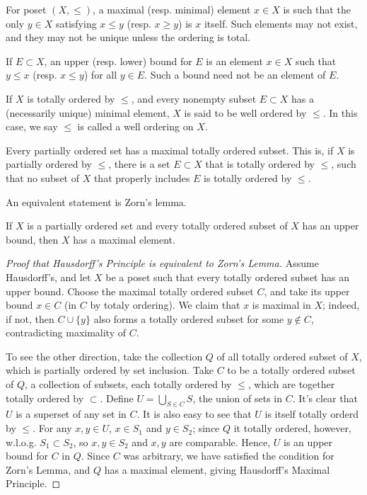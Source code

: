 \documentclass[12pt]{article} %
\begin{document}
\begin{definition}
    For poset $(X, \leq)$, a maximal (resp. minimal) element $x \in X$ is such that the only $y \in X$ satisfying $x \leq y$ (resp. $x \geq y$) is $x$ itself. Such elements may not exist, and they may not be unique unless the ordering is total.

    If $E \subset X$, an upper (resp. lower) bound for $E$ is an element $x \in X$ such that $y \leq x$ (resp. $x \leq y$) for all $y \in E$. Such a bound need not be an element of $E$.
\end{definition}

\begin{definition}
    If $X$ is totally ordered by $\leq$, and every nonempty subset $E \subset X$ has a (necessarily unique) minimal element, $X$ is said to be well ordered by $\leq$. In this case, we say $\leq$ is called a well ordering on $X$.
\end{definition}

\begin{principle}
    Every partially ordered set has a maximal totally ordered subset. This is, if $X$ is partially ordered by $\leq$, there is a set $E \subset X$ that is totally ordered by $\leq$, such that no subset of $X$ that properly includes $E$ is totally ordered by $\leq$.
\end{principle}

\noindent An equivalent statement is Zorn's lemma.

\begin{principle}
    If $X$ is a partially ordered set and every totally ordered subset of $X$ has an upper bound, then $X$ has a maximal element.
\end{principle}

\begin{proof}[Proof that Hausdorff's Principle is equivalent to Zorn's Lemma]
    Assume Hausdorff's, and let $X$ be a poset such that every totally ordered subset has an upper bound. Choose the maximal totally ordered subset $C$, and take its upper bound $x \in C$ (in $C$ by totaly ordering). We claim that $x$ is maximal in $X$; indeed, if not, then $C \cup \{y\}$ also forms a totally ordered subset for some $y \notin C$, contradicting maximality of $C$.

    To see the other direction, take the collection $Q$ of all totally ordered subset of $X$, which is partially ordered by set inclusion. Take $C$ to be a totally ordered subset of $Q$, a collection of subsets, each totally ordered by $\leq$, which are together totally ordered by $\subset$. Define $U = \bigcup_{S \in C} S$, the union of sets in $C$. It's clear that $U$ is a superset of any set in $C$. It is also easy to see that $U$ is itself totally orderd by $\leq$. For any $x, y \in U$, $x \in S_1$ and $y \in S_2$; since $Q$ it totally ordered, however, w.l.o.g. $S_1 \subset S_2$, so $x, y \in S_2$ and $x, y$ are comparable. Hence, $U$ is an upper bound for $C$ in $Q$. Since $C$ was arbitrary, we have satisfied the condition for Zorn's Lemma, and $Q$ has a maximal element, giving Hausdorff's Maximal Principle.
\end{proof}
\end{document}
